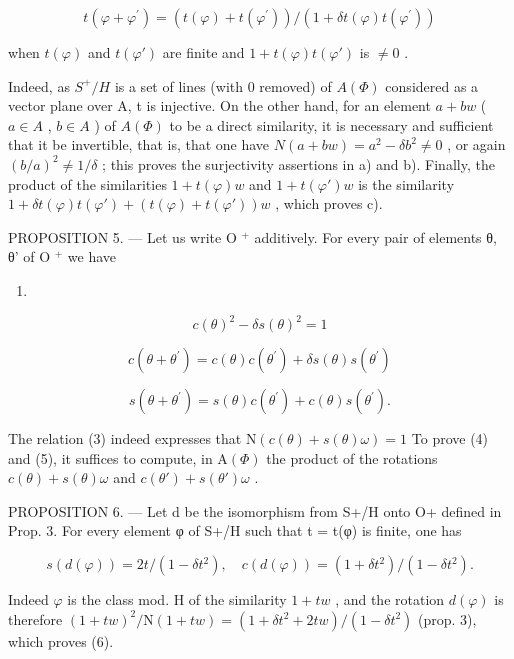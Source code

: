\[
t (\varphi + \varphi^ {\prime}) = (t (\varphi) + t (\varphi^ {\prime})) / (1 + \delta t (\varphi) t (\varphi^ {\prime}))\tag{2}
\]

when \(t(\varphi)\) and \(t(\varphi')\) are finite and \(1 + t(\varphi)t(\varphi')\) is \(\neq 0\) .

Indeed, as \(S^{+}/H\) is a set of lines (with 0 removed) of \(A(\Phi)\) considered as a vector plane over A, t is injective. On the other hand, for an element \(a + bw\) ( \(a \in A\) , \(b \in A\) ) of \(A(\Phi)\) to be a direct similarity, it is necessary and sufficient that it be invertible, that is, that one have \(N(a + bw) = a^{2} - \delta b^{2} \neq 0\) , or again \((b/a)^{2} \neq 1/\delta\) ; this proves the surjectivity assertions in a) and b). Finally, the product of the similarities \(1 + t(\varphi)w\) and \(1 + t(\varphi')w\) is the similarity \(1 + \delta t(\varphi)t(\varphi') + (t(\varphi) + t(\varphi'))w\) , which proves c).

PROPOSITION 5. --- Let us write O \(^{+}\) additively. For every pair of elements θ, θ' of O \(^{+}\) we have

\begin{enumerate}
\def\labelenumi{(\arabic{enumi})}
\setcounter{enumi}{2}
\tightlist
\item
\end{enumerate}

\[
c (\theta) ^ {2} - \delta s (\theta) ^ {2} = 1\tag{4}
\]

\[
c (\theta + \theta^ {\prime}) = c (\theta) c (\theta^ {\prime}) + \delta s (\theta) s (\theta^ {\prime})\tag{5}
\]

\[
s (\theta + \theta^ {\prime}) = s (\theta) c (\theta^ {\prime}) + c (\theta) s (\theta^ {\prime}).
\]

The relation (3) indeed expresses that \(\mathrm{N}(c(\theta)+s(\theta)\omega)=1\) To prove (4) and (5), it suffices to compute, in \(\mathrm{A}(\Phi)\) the product of the rotations \(c(\theta)+s(\theta)\omega\) and \(c(\theta')+s(\theta')\omega\) .

PROPOSITION 6. — Let d be the isomorphism from S+/H onto O+ defined in Prop. 3. For every element φ of S+/H such that t = t(φ) is finite, one has

\[
s (d (\varphi)) = 2 t / (1 - \delta t ^ {2}), \quad c (d (\varphi)) = (1 + \delta t ^ {2}) / (1 - \delta t ^ {2}).\tag{6}
\]

Indeed \(\varphi\) is the class mod. H of the similarity \(1 + tw\) , and the rotation \(d(\varphi)\) is therefore \((1 + tw)^2/\mathrm{N}(1 + tw) = (1 + \delta t^2 + 2tw)/(1 - \delta t^2)\) (prop. 3), which proves (6).

